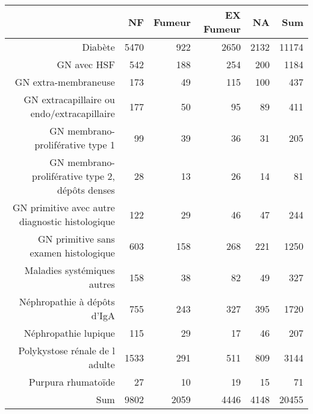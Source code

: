 \documentclass[11pt,a4paper]{article}\usepackage[]{graphicx}\usepackage[]{color}
\begin{document}
\begin{table}[H]
\centering
\begin{tabular}{rrrrrr}
  \hline
 & NF & Fumeur & EX Fumeur & NA & Sum \\ 
  \hline
Diabète & 5470 & 922 & 2650 & 2132 & 11174 \\ 
  GN avec HSF & 542 & 188 & 254 & 200 & 1184 \\ 
  GN extra-membraneuse & 173 & 49 & 115 & 100 & 437 \\ 
  GN extracapillaire ou endo/extracapillaire & 177 & 50 & 95 & 89 & 411 \\ 
  GN membrano-proliférative type 1 & 99 & 39 & 36 & 31 & 205 \\ 
  GN membrano-proliférative type 2, dépôts denses & 28 & 13 & 26 & 14 & 81 \\ 
  GN primitive avec autre diagnostic histologique & 122 & 29 & 46 & 47 & 244 \\ 
  GN primitive sans examen histologique & 603 & 158 & 268 & 221 & 1250 \\ 
  Maladies systémiques autres & 158 & 38 & 82 & 49 & 327 \\ 
  Néphropathie à dépôts d'IgA & 755 & 243 & 327 & 395 & 1720 \\ 
  Néphropathie lupique & 115 & 29 & 17 & 46 & 207 \\ 
  Polykystose rénale de l adulte & 1533 & 291 & 511 & 809 & 3144 \\ 
  Purpura rhumatoïde & 27 & 10 & 19 & 15 & 71 \\ 
  Sum & 9802 & 2059 & 4446 & 4148 & 20455 \\ 
   \hline
\end{tabular}
\end{table}
\end{document}
